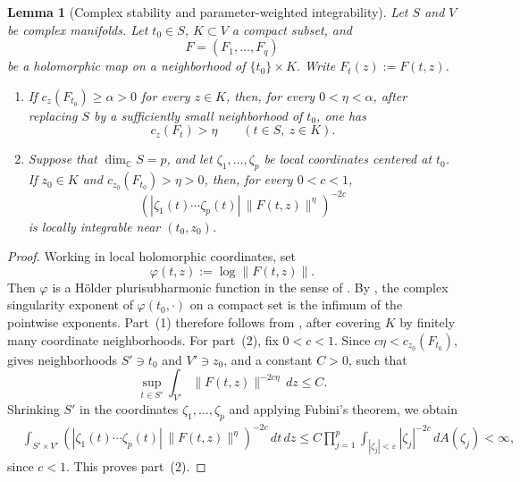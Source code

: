 \documentclass[reqno,11pt]{amsart}
\numberwithin{equation}{section}
\newtheorem{lemma}[theorem]{Lemma}
\theoremstyle{definition}
\theoremstyle{remark}
\begin{document}
\begin{lemma}[Complex stability and parameter-weighted integrability]
\label{lem:complex-stability-slicing}
Let $S$ and $V$ be complex manifolds. Let $t_0\in S$, $K\subset V$ a
compact subset, and 
$$
F=(F_1,\ldots,F_q)
$$
be a holomorphic map on a neighborhood of $\{t_0\}\times K$.  Write
$F_t(z):=F(t,z)$.

\begin{enumerate}
\item If $c_z(F_{t_0})\ge\alpha>0$ for every $z\in K$, then, for every
$0<\eta<\alpha$, after replacing $S$ by a sufficiently small neighborhood of $t_0$, one has
$$
c_z(F_t)>\eta
\qquad(t\in S,\ z\in K).
$$

\item Suppose that $\dim_{\mathbb C}S=p$, and let
$\zeta_1,\ldots,\zeta_p$ be local coordinates centered at $t_0$.  If
$z_0\in K$ and $c_{z_0}(F_{t_0})>\eta>0$, then, for every $0<c<1$,
\begin{equation}\label{eq:coordinate-slicing-density}
\left(
 |\zeta_1(t) \cdots\zeta_p (t) |\,\|F(t,z)\|^\eta
\right)^{-2c}
\end{equation}
is locally integrable near $(t_0,z_0)$.
\end{enumerate}
\end{lemma}
\begin{proof}
Working in local holomorphic coordinates, set
$$
\varphi(t,z):=\log\|F(t,z)\|.
$$
Then $\varphi$ is a H\"older plurisubharmonic function in the sense of
\cite[Definition~2.3]{DemaillyKollar2001}. By
\cite[Proposition~1.2]{DemaillyKollar2001}, the complex singularity
exponent of $\varphi(t_0,\cdot)$ on a compact set is the infimum of the
pointwise exponents. Part~\textnormal{(1)} therefore follows from
\cite[Lemma~3.2(1)]{DemaillyKollar2001}, after covering $K$ by finitely
many coordinate neighborhoods.
For part~\textnormal{(2)}, fix $0<c<1$. Since
$c\eta<c_{z_0}(F_{t_0})$, \cite[Lemma~3.2(2)]{DemaillyKollar2001} gives
neighborhoods $S'\ni t_0$ and $V'\ni z_0$, and a constant $C>0$, such
that
$$
\sup_{t\in S'}\int_{V'}\|F(t,z)\|^{-2c\eta}\,dz\le C.
$$
Shrinking $S'$ in the coordinates $\zeta_1,\ldots,\zeta_p$ and applying
Fubini's theorem, we obtain
$$
\begin{aligned}
&\int_{S'\times V'}
\left(
|\zeta_1(t)\cdots\zeta_p(t)|\,\|F(t,z)\|^\eta
\right)^{-2c}
\,dt\,dz \le
C\prod_{j=1}^p
\int_{|\zeta_j|<\varepsilon}|\zeta_j|^{-2c}\,dA(\zeta_j)
<\infty,
\end{aligned}
$$
since $c<1$. This proves part~\textnormal{(2)}.
\end{proof}
\end{document}
